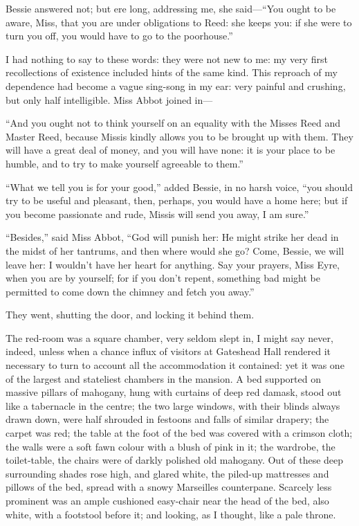 Bessie answered not; but ere long, addressing me, she
said---\enquote{You ought to be aware, Miss, that you are under
	obligations to \Mrs{} Reed: she keeps you: if she were to turn you off,
	you would have to go to the poorhouse.}

I had nothing to say to these words: they were not new to me: my very
first recollections of existence included hints of the same kind.  This
reproach of my dependence had become a vague sing-song in my ear: very
painful and crushing, but only half intelligible.  Miss Abbot joined
in---

\enquote{And you ought not to think yourself on an equality with the
	Misses Reed and Master Reed, because Missis kindly allows you to be
	brought up with them.  They will have a great deal of money, and you
	will have none: it is your place to be humble, and to try to make
	yourself agreeable to them.}

\enquote{What we tell you is for your good,} added Bessie, in no harsh
voice, \enquote{you should try to be useful and pleasant, then, perhaps,
	you would have a home here; but if you become passionate and rude,
	Missis will send you away, I am sure.}

\enquote{Besides,} said Miss Abbot, \enquote{God will punish her: He
	might strike her dead in the midst of her tantrums, and then where would
	she go?  Come, Bessie, we will leave her: I wouldn't have her heart for
	anything.  Say your prayers, Miss Eyre, when you are by yourself; for if
	you don't repent, something bad might be permitted to come down the
	chimney and fetch you away.}

They went, shutting the door, and locking it behind them.

The red-room was a square chamber, very seldom slept in, I might say
never, indeed, unless when a chance influx of visitors at Gateshead Hall
rendered it necessary to turn to account all the accommodation it
contained: yet it was one of the largest and stateliest chambers in the
mansion.  A bed supported on massive pillars of mahogany, hung with
curtains of deep red damask, stood out like a tabernacle in the centre;
the two large windows, with their blinds always drawn down, were half
shrouded in festoons and falls of similar drapery; the carpet was red;
the table at the foot of the bed was covered with a crimson cloth; the
walls were a soft fawn colour with a blush of pink in it; the wardrobe,
the toilet-table, the chairs were of darkly polished old mahogany.  Out
of these deep surrounding shades rose high, and glared white, the
piled-up mattresses and pillows of the bed, spread with a snowy
Marseilles counterpane.  Scarcely less prominent was an ample cushioned
easy-chair near the head of the bed, also white, with a footstool before
it; and looking, as I thought, like a pale throne.

